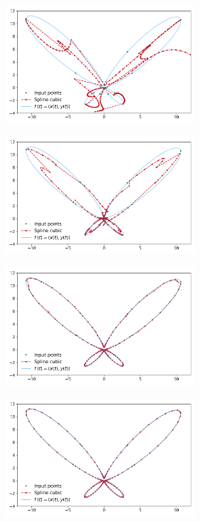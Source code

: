 \begin{figure}[H]
	\centering
	\begin{subfigure}[b]{7cm}
		\includegraphics[width=7cm]{Graphics/problema04b_10.png}
		\caption{}
	\end{subfigure}
	\begin{subfigure}[b]{7cm}
		\includegraphics[width=7cm]{Graphics/problema04b_25.png}
		\caption{}
	\end{subfigure}
	\begin{subfigure}[b]{7cm}
		\includegraphics[width=7cm]{Graphics/problema04b_50.png}
		\caption{}
	\end{subfigure}
	\begin{subfigure}[b]{7cm}
		\includegraphics[width=7cm]{Graphics/problema04b_100.png}
		\caption{}
	\end{subfigure}
	\caption{}
\end{figure}
\pagebreak

